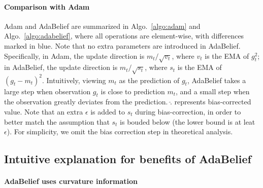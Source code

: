 \documentclass{article}
\begin{document}
\paragraph{Comparison with Adam} Adam and AdaBelief are summarized in Algo.~\ref{algo:adam} and Algo.~\ref{algo:adabelief}, where all operations are element-wise, with differences marked in blue. Note that no extra parameters are introduced in AdaBelief. Specifically, in Adam, the update direction is $m_t/\sqrt{v_t}$, where $v_t$ is the EMA of $g_t^2$; in AdaBelief, the update direction is $m_t/\sqrt{s_t}$, where $s_t$ is the EMA of $(g_t - m_t)^2$. Intuitively, viewing $m_t$ as the prediction of $g_t$, AdaBelief takes a large step when observation $g_t$ is close to prediction $m_t$, and a small step when the observation greatly deviates from the prediction.  $\widehat{.}$ represents bias-corrected value. Note that an extra $\epsilon$ is added to $s_t$ during bias-correction, in order to better match the assumption that $s_t$ is bouded below (the lower bound is at leat $\epsilon$). For simplicity, we omit the bias correction step in theoretical analysis.
\subsection{Intuitive explanation for benefits of AdaBelief}
\label{sec:intuition}
\paragraph{AdaBelief uses curvature information}
\label{subsec:curvature}
\end{document}
